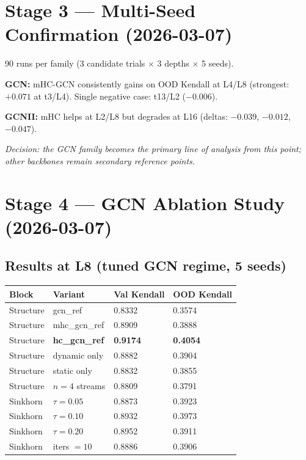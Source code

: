 \documentclass[11pt,a4paper]{article}
\begin{document}
\section{Stage 3 --- Multi-Seed Confirmation (2026-03-07)}

90 runs per family (3 candidate trials $\times$ 3 depths $\times$ 5 seeds).

\textbf{GCN:} mHC-GCN consistently gains on OOD Kendall at L4/L8
(strongest: $+0.071$ at t3/L4). Single negative case: t13/L2 ($-0.006$).

\textbf{GCNII:} mHC helps at L2/L8 but degrades at L16
(deltas: $-0.039$, $-0.012$, $-0.047$).

\textit{Decision: the GCN family becomes the primary line of analysis from this point; other backbones remain secondary reference points.}

\section{Stage 4 --- GCN Ablation Study (2026-03-07)}

\subsection{Results at L8 (tuned GCN regime, 5 seeds)}
\begin{table}[h]
\centering
\begin{tabular}{L{3.5cm} L{3.5cm} R{2.5cm} R{2.5cm}}
\toprule
Block & Variant & Val Kendall & OOD Kendall \\
\midrule
Structure & gcn\_ref          & 0.8332 & 0.3574 \\
Structure & mhc\_gcn\_ref     & 0.8909 & 0.3888 \\
Structure & \textbf{hc\_gcn\_ref} & \textbf{0.9174} & \textbf{0.4054} \\
Structure & dynamic only      & 0.8882 & 0.3904 \\
Structure & static only       & 0.8832 & 0.3855 \\
Structure & $n=4$ streams     & 0.8809 & 0.3791 \\
\midrule
Sinkhorn  & $\tau=0.05$       & 0.8873 & 0.3923 \\
Sinkhorn  & $\tau=0.10$       & 0.8932 & 0.3973 \\
Sinkhorn  & $\tau=0.20$       & 0.8952 & 0.3911 \\
Sinkhorn  & iters $=10$       & 0.8886 & 0.3906 \\
\bottomrule
\end{tabular}
\end{table}
\end{document}
